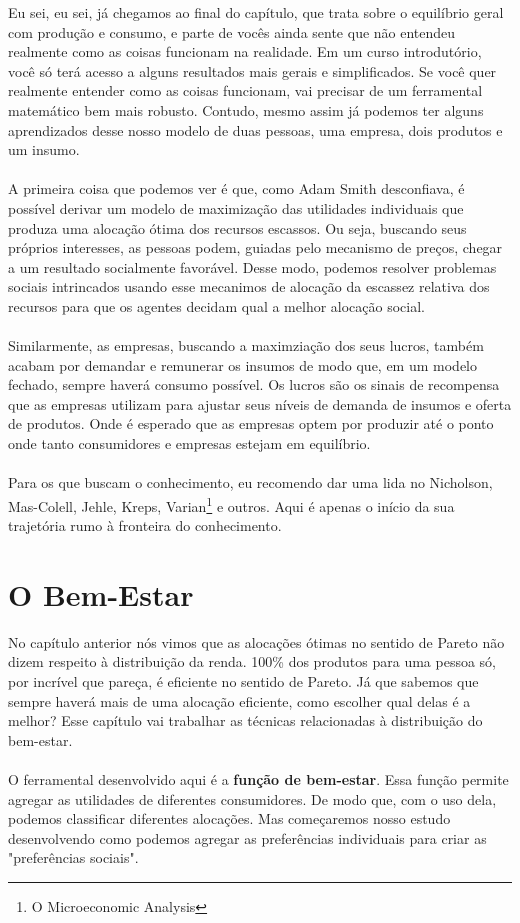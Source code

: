 \documentclass[a4paper,11pt,oneside]{book}
\theoremstyle{definition}
\theoremstyle{break}
\begin{document}
Eu sei, eu sei, já chegamos ao final do capítulo, que trata sobre o equilíbrio geral com produção e consumo, e parte de vocês ainda sente que não entendeu realmente como as coisas funcionam na realidade. Em um curso introdutório, você só terá acesso a alguns resultados mais gerais e simplificados. Se você quer realmente entender como as coisas funcionam, vai precisar de um ferramental matemático bem mais robusto. Contudo, mesmo assim já podemos ter alguns aprendizados desse nosso modelo de duas pessoas, uma empresa, dois produtos e um insumo.
\\
\\
A primeira coisa que podemos ver é que, como Adam Smith desconfiava, é possível derivar um modelo de maximização das utilidades individuais que produza uma alocação ótima dos recursos escassos. Ou seja, buscando seus próprios interesses, as pessoas podem, guiadas pelo mecanismo de preços, chegar a um resultado socialmente favorável. Desse modo, podemos resolver problemas sociais intrincados usando esse mecanimos de alocação da escassez relativa dos recursos para que os agentes decidam qual a melhor alocação social.
\\
\\
Similarmente, as empresas, buscando a maximziação dos seus lucros, também acabam por demandar e remunerar os insumos de modo que, em um modelo fechado, sempre haverá consumo possível. Os lucros são os sinais de recompensa que as empresas utilizam para ajustar seus níveis de demanda de insumos e oferta de produtos. Onde é esperado que as empresas optem por produzir até o ponto onde tanto consumidores e empresas estejam em equilíbrio.
\\
\\
Para os que buscam o conhecimento, eu recomendo dar uma lida no Nicholson, Mas-Colell, Jehle, Kreps, Varian\footnote{O Microeconomic Analysis} e outros. Aqui é apenas o início da sua trajetória rumo à fronteira do conhecimento.


\chapter{O Bem-Estar}

No capítulo anterior nós vimos que as alocações ótimas no sentido de Pareto não dizem respeito à distribuição da renda. 100\% dos produtos para uma pessoa só, por incrível que pareça, é eficiente no sentido de Pareto. Já que sabemos que sempre haverá mais de uma alocação eficiente, como escolher qual delas é a melhor? Esse capítulo vai trabalhar as técnicas relacionadas à distribuição do bem-estar.
\\
\\
O ferramental desenvolvido aqui é a \textbf{função de bem-estar}. Essa função permite agregar as utilidades de diferentes consumidores. De modo que, com o uso dela, podemos classificar diferentes alocações. Mas começaremos nosso estudo desenvolvendo como podemos agregar as preferências individuais para criar as "preferências sociais".
\end{document}
